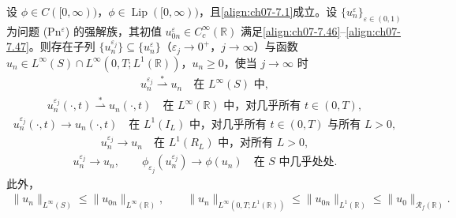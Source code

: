 ﻿\documentclass[../../main.tex]{subfiles}%
\begin{document}
\begin{lemma}\label{lemma:ch07-7.4.5}
设 $\phi\in C([0,\infty))$，$\phi\in\operatorname{Lip}([0,\infty))$，且\eqref{align:ch07-7.1}成立。设 $\{u_n^\varepsilon\}_{\varepsilon\in(0,1)}$ 为问题 (Pn$^\varepsilon$) 的强解族，其初值 $u_{0n}^\varepsilon\in C^\infty_c(\mathbb{R})$ 满足\eqref{align:ch07-7.46}--\eqref{align:ch07-7.47}。则存在子列 $\{u_n^{\varepsilon_j}\}\subseteq\{u_n^\varepsilon\}$（$\varepsilon_j\to0^+$，$j\to\infty$）与函数 $u_n\in L^\infty(S)\cap L^\infty(0,T;L^1(\mathbb{R}))$，$u_n\geqslant0$，使当 $j\to\infty$ 时
\begin{align}
u_n^{\varepsilon_j}\stackrel{*}{\rightharpoonup}u_n\quad\text{在 }L^\infty(S)\text{ 中}, \label{align:ch07-7.66}
\end{align}
\begin{align}
u_n^{\varepsilon_j}(\cdot,t)\stackrel{*}{\rightharpoonup}u_n(\cdot,t)\quad\text{在 }L^\infty(\mathbb{R})\text{ 中，对几乎所有 }t\in(0,T), \label{align:ch07-7.67}
\end{align}
\begin{align}
u_n^{\varepsilon_j}(\cdot,t)\to u_n(\cdot,t)\quad\text{在 }L^1(I_L)\text{ 中，对几乎所有 }t\in(0,T)\text{ 与所有 }L>0, \label{align:ch07-7.68}
\end{align}
\begin{align}
u_n^{\varepsilon_j}\to u_n\quad\text{在 }L^1(R_L)\text{ 中，对所有 }L>0, \label{align:ch07-7.69}
\end{align}
\begin{align}
u_n^{\varepsilon_j}\to u_n,\qquad \phi_{\varepsilon_j}(u_n^{\varepsilon_j})\to\phi(u_n)\quad\text{在 }S\text{ 中几乎处处}. \label{align:ch07-7.70}
\end{align}
此外，
\begin{align}
\|u_n\|_{L^\infty(S)}\leqslant\|u_{0n}\|_{L^\infty(\mathbb{R})},\qquad
\|u_n\|_{L^\infty(0,T;L^1(\mathbb{R}))}\leqslant\|u_{0n}\|_{L^1(\mathbb{R})}\leqslant\|u_0\|_{\mathscr{R}_f(\mathbb{R})}. \label{align:ch07-7.71}
\end{align}
\end{lemma}
\end{document}
